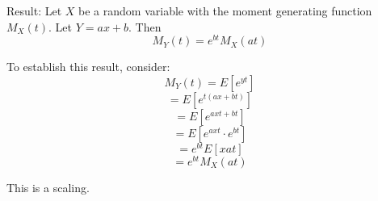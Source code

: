 Result: Let $X$ be a random variable with the moment generating function $M_X (t)$. Let $Y = ax + b$. Then
$$M_Y (t) = e^{bt} M_X (at)$$

To establish this result, consider:
$$M_Y (t) = E[e^{yt}]$$
$$ = E[e^{t(ax+bt)} ]$$
$$ = E[e^{axt + bt}]$$
$$ = E[e^{axt} \cdot e^{bt}]$$
$$ = e^{bt} E[xat]$$
$$ = e^{bt} M_X (at)$$

This is a scaling.

